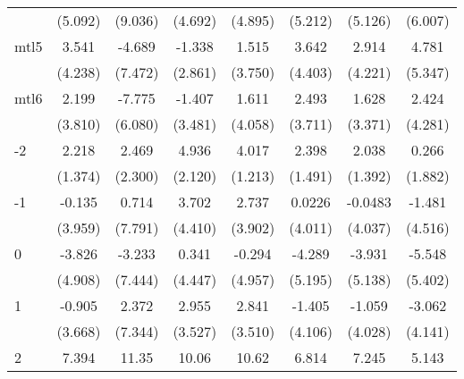 \documentclass{article}
\begin{document}
{\begin{longtable}{l*{7}{c}}
                &  (5.092)         &  (9.036)         &  (4.692)         &  (4.895)         &  (5.212)         &  (5.126)         &  (6.007)         \\
mtl5            &    3.541         &   -4.689         &   -1.338         &    1.515         &    3.642         &    2.914         &    4.781         \\
                &  (4.238)         &  (7.472)         &  (2.861)         &  (3.750)         &  (4.403)         &  (4.221)         &  (5.347)         \\
mtl6            &    2.199         &   -7.775         &   -1.407         &    1.611         &    2.493         &    1.628         &    2.424         \\
                &  (3.810)         &  (6.080)         &  (3.481)         &  (4.058)         &  (3.711)         &  (3.371)         &  (4.281)         \\
-2              &    2.218         &    2.469         &    4.936\sym{*}  &    4.017\sym{**} &    2.398         &    2.038         &    0.266         \\
                &  (1.374)         &  (2.300)         &  (2.120)         &  (1.213)         &  (1.491)         &  (1.392)         &  (1.882)         \\
-1              &   -0.135         &    0.714         &    3.702         &    2.737         &   0.0226         &  -0.0483         &   -1.481         \\
                &  (3.959)         &  (7.791)         &  (4.410)         &  (3.902)         &  (4.011)         &  (4.037)         &  (4.516)         \\
0               &   -3.826         &   -3.233         &    0.341         &   -0.294         &   -4.289         &   -3.931         &   -5.548         \\
                &  (4.908)         &  (7.444)         &  (4.447)         &  (4.957)         &  (5.195)         &  (5.138)         &  (5.402)         \\
1               &   -0.905         &    2.372         &    2.955         &    2.841         &   -1.405         &   -1.059         &   -3.062         \\
                &  (3.668)         &  (7.344)         &  (3.527)         &  (3.510)         &  (4.106)         &  (4.028)         &  (4.141)         \\
2               &    7.394\sym{*}  &    11.35\sym{**} &    10.06\sym{**} &    10.62\sym{**} &    6.814\sym{*}  &    7.245\sym{*}  &    5.143         \\

\end{longtable}}
\end{document}
